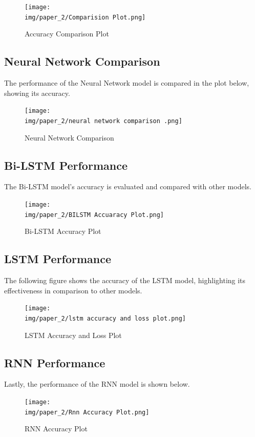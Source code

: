 \begin{figure}[H]
	\centering
	\texttt{[image: \\img/paper\_2/Comparision Plot.png]}
	\caption{Accuracy Comparison Plot}
	\label{fig:accuracy_comparison}
\end{figure}

\subsection{Neural Network Comparison}
The performance of the Neural Network model is compared in the plot below, showing its accuracy.

\begin{figure}[H]
	\centering
	\texttt{[image: \\img/paper\_2/neural network comparison .png]}
	\caption{Neural Network Comparison}
	\label{fig:nn_comparison}
\end{figure}

\subsection{Bi-LSTM Performance}
The Bi-LSTM model's accuracy is evaluated and compared with other models.

\begin{figure}[H]
	\centering
	\texttt{[image: \\img/paper\_2/BILSTM Accuaracy Plot.png]}
	\caption{Bi-LSTM Accuracy Plot}
	\label{fig:bilstm_accuracy}
\end{figure}

\subsection{LSTM Performance}
The following figure shows the accuracy of the LSTM model, highlighting its effectiveness in comparison to other models.

\begin{figure}[H]
	\centering
	\texttt{[image: \\img/paper\_2/lstm accuracy and loss plot.png]}
	\caption{LSTM Accuracy and Loss Plot}
	\label{fig:lstm_accuracy}
\end{figure}

\subsection{RNN Performance}
Lastly, the performance of the RNN model is shown below.

\begin{figure}[H]
	\centering
	\texttt{[image: \\img/paper\_2/Rnn Accuracy Plot.png]}
	\caption{RNN Accuracy Plot}
	\label{fig:rnn_accuracy}
\end{figure}


